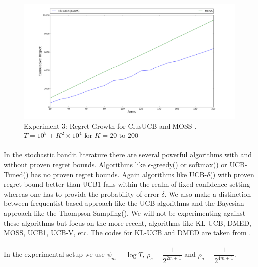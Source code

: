 \hspace{0.1em}

\begin{figure}[!tbp]
\label{fig:3}
\begin{minipage}[b]{0.5\textwidth}
\includegraphics[width=\textwidth]{img/clUCB_MOSS_expt3.png}
\caption{Experiment 3: Regret Growth for ClusUCB and MOSS . $T=10^{5} + K^{2}\times 10^{4}$ for $K=20$ to $200$}
\end{minipage}
\end{figure}

\hspace{0.1em}



\paragraph{}In the stochastic bandit literature there are several powerful algorithms with and without proven regret bounds. Algorithms like $\epsilon$-greedy(\cite{sutton1998reinforcement}) or softmax(\cite{sutton1998reinforcement}) or UCB-Tuned(\cite{auer2002finite}) has no proven regret bounds. Again algorithms like UCB-$\delta$(\cite{abbasi2011improved}) with proven regret bound better than UCB1  falls within the realm of fixed confidence setting whereas one has to provide the probability of error $\delta$. We also make a distinction between frequentist based approach like the UCB algorithms and the Bayesian approach like the Thompson Sampling(\cite{agrawal2011analysis}). We will not be experimenting against these algorithms but focus on the more recent, algorithms like KL-UCB, DMED, MOSS, UCB1, UCB-V, etc. The codes for KL-UCB and DMED are taken from \cite{CapGarKau12}.

\paragraph{}In the experimental setup we use $\psi_{m}=\log T$, $\rho_{s}=\dfrac{1}{2^{2m+1}}$ and $\rho_{a}=\dfrac{1}{2^{4m+1}}$.

